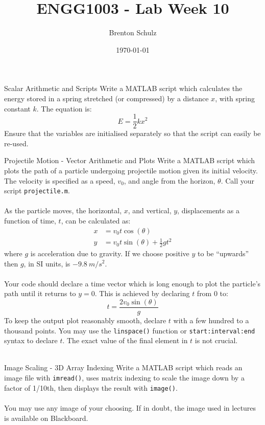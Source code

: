 \documentclass{lab}
\title{ENGG1003 - Lab Week 10}
\author{Brenton Schulz}
\date{\today}
\begin{document}
\maketitle

\begin{task}{Scalar Arithmetic and Scripts}{}
Write a MATLAB script which calculates the energy stored in a spring stretched (or compressed) by a distance $x$, with spring constant $k$. The equation is:
\begin{equation*}
E = \frac{1}{2}k x^2
\end{equation*}
Ensure that the variables are initialised separately so that the script can easily be re-used.
\end{task}

\begin{task}{Projectile Motion - Vector Arithmetic and Plots}{}
Write a MATLAB script which plots the path of a particle undergoing projectile motion given its initial velocity. The velocity is specified as a speed, $v_0$, and angle from the horizon, $\theta$. Call your script \texttt{projectile.m}.
\\~\\
As the particle moves, the horizontal, $x$, and vertical, $y$, displacements as a function of time, $t$, can be calculated as:
\begin{align*}
x &= v_0 t \cos(\theta) \\
y &= v_0 t \sin(\theta) + \frac{1}{2}g t^2
\end{align*}
where $g$ is acceleration due to gravity. If we choose positive $y$ to be ``upwards'' then $g$, in SI units, is $-9.8~{m/s^2}$.
\\~\\
Your code should declare a time vector which is long enough to plot the particle's path until it returns to $y=0$. This is achieved by declaring $t$ from 0 to:
\begin{equation*}
t = \frac{2 v_0 \sin(\theta)}{g}
\end{equation*}
To keep the output plot reasonably smooth, declare $t$ with a few hundred to a thousand points. You may use the \texttt{linspace()} function or \texttt{start:interval:end} syntax to declare $t$. The exact value of the final element in $t$ is not crucial.
\\~\\
\end{task}

\begin{task}{Image Scaling - 3D Array Indexing}{}
Write a MATLAB script which reads an image file with \texttt{imread()}, uses matrix indexing to scale the image down by a factor of 1/10th, then displays the result with \texttt{image()}.
\\~\\
You may use any image of your choosing. If in doubt, the image used in lectures is available on Blackboard.
\end{task}
\end{document}
